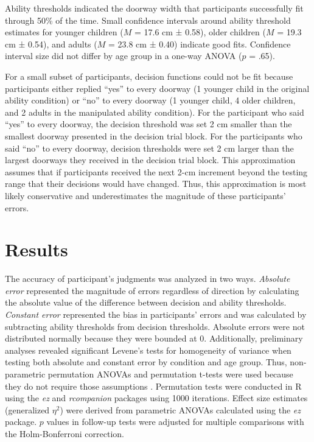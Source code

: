 \documentclass[a4paper,man,natbib,floatsintext,noextraspace]{apa6}
\begin{document}
Ability thresholds indicated the doorway width that participants successfully fit through 50\% of the time. Small confidence intervals around ability threshold estimates for younger children ($M$ = 17.6 cm ± 0.58), older children ($M$ = 19.3 cm ± 0.54), and adults ($M$ = 23.8 cm ± 0.40) indicate good fits. Confidence interval size did not differ by age group in a one-way ANOVA ($p$ = .65).

For a small subset of participants, decision functions could not be fit because participants either replied “yes” to every doorway (1 younger child in the original ability condition) or “no” to every doorway (1 younger child, 4 older children, and 2 adults in the manipulated ability condition). For the participant who said “yes” to every doorway, the decision threshold was set 2 cm smaller than the smallest doorway presented in the decision trial block. For the participants who said “no” to every doorway, decision thresholds were set 2 cm larger than the largest doorways they received in the decision trial block. This approximation assumes that if participants received the next 2-cm increment beyond the testing range that their decisions would have changed. Thus, this approximation is most likely conservative and underestimates the magnitude of these participants’ errors. 

\section{Results}

The accuracy of participant’s judgments was analyzed in two ways. \textit{Absolute error} represented the magnitude of errors regardless of direction by calculating the absolute value of the difference between decision and ability thresholds. \textit{Constant error} represented the bias in participants’ errors and was calculated by subtracting ability thresholds from decision thresholds. Absolute errors were not distributed normally because they were bounded at 0. Additionally, preliminary analyses revealed significant Levene’s tests for homogeneity of variance when testing both absolute and constant error by condition and age group. Thus, non-parametric permutation ANOVAs and permutation t-tests were used because they do not require those assumptions \citep{Edgington}. Permutation tests were conducted in R using the \textit{ez} and \textit{rcompanion} packages using 1000 iterations. Effect size estimates (generalized $\eta^{2}$) were derived from parametric ANOVAs calculated using the \textit{ez} package. $p$ values in follow-up tests were adjusted for multiple comparisons with the Holm-Bonferroni correction.
\end{document}
